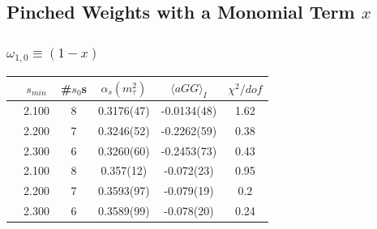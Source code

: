 \documentclass{beamer}
\begin{document}
\subsection{Pinched Weights with a Monomial Term \(x\)}
\begin{frame}
  \frametitle{\(\omega_{1,0} \equiv (1-x)\)}
  \centering
  \begin{tabular}{cccccc}
    \toprule
    & \(s_{min}\) & \#\(s_0\)s & \(\alpha_s(m_\tau^2)\) & \(\langle aGG \rangle_I\) & \(\chi^2/dof\)  \\
    \midrule
    \parbox[t]{2mm}{}
    & 2.100 & 8 & 0.3176(47) & -0.0134(48) & 1.62 \\
    & 2.200 & 7 & 0.3246(52) & -0.2262(59) & 0.38 \\
    & 2.300 & 6 & 0.3260(60) & -0.2453(73) & 0.43 \\
    \midrule
    \parbox[t]{2mm}{}
    & 2.100 & 8  & 0.357(12) & -0.072(23) & 0.95 \\
    & 2.200 & 7 &  0.3593(97) & -0.079(19) & 0.2 \\
    & 2.300 & 6 & 0.3589(99) & -0.078(20) & 0.24 \\
    \bottomrule
  \end{tabular}
\end{frame}
\end{document}
